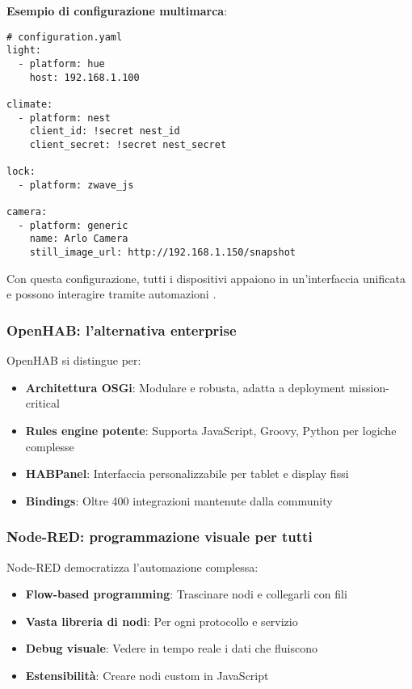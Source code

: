 \textbf{Esempio di configurazione multimarca}:
\begin{verbatim}
# configuration.yaml
light:
  - platform: hue
    host: 192.168.1.100
  
climate:
  - platform: nest
    client_id: !secret nest_id
    client_secret: !secret nest_secret

lock:
  - platform: zwave_js
    
camera:
  - platform: generic
    name: Arlo Camera
    still_image_url: http://192.168.1.150/snapshot
\end{verbatim}

Con questa configurazione, tutti i dispositivi appaiono in un'interfaccia unificata e possono interagire tramite automazioni \cite{HomeAssistant2024}.

\subsubsection{OpenHAB: l'alternativa enterprise}

OpenHAB si distingue per:

\begin{itemize}
    \item \textbf{Architettura OSGi}: Modulare e robusta, adatta a deployment mission-critical
    \item \textbf{Rules engine potente}: Supporta JavaScript, Groovy, Python per logiche complesse
    \item \textbf{HABPanel}: Interfaccia personalizzabile per tablet e display fissi
    \item \textbf{Bindings}: Oltre 400 integrazioni mantenute dalla community
\end{itemize}

\subsubsection{Node-RED: programmazione visuale per tutti}

Node-RED democratizza l'automazione complessa:

\begin{itemize}
    \item \textbf{Flow-based programming}: Trascinare nodi e collegarli con fili
    \item \textbf{Vasta libreria di nodi}: Per ogni protocollo e servizio
    \item \textbf{Debug visuale}: Vedere in tempo reale i dati che fluiscono
    \item \textbf{Estensibilità}: Creare nodi custom in JavaScript
\end{itemize}

